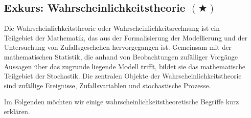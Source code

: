 \subsection{Exkurs: Wahrscheinlichkeitstheorie $ (\bigstar) $}
\begin{Def}
Die Wahrscheinlichkeitstheorie oder Wahrscheinlichkeitsrechnung ist ein Teilgebiet der Mathematik, das aus der Formalisierung der Modellierung und der Untersuchung von Zufallsgeschehen hervorgegangen ist. Gemeinsam mit der mathematischen Statistik, die anhand von Beobachtungen zufälliger Vorgänge Aussagen über das zugrunde liegende Modell trifft, bildet sie das mathematische Teilgebiet der Stochastik. Die zentralen Objekte der Wahrscheinlichkeitstheorie sind zufällige Ereignisse, Zufallsvariablen und stochastische Prozesse.
\end{Def}
Im Folgenden möchten wir einige wahrscheinlichkeitstheoretische Begriffe kurz erklären. 
